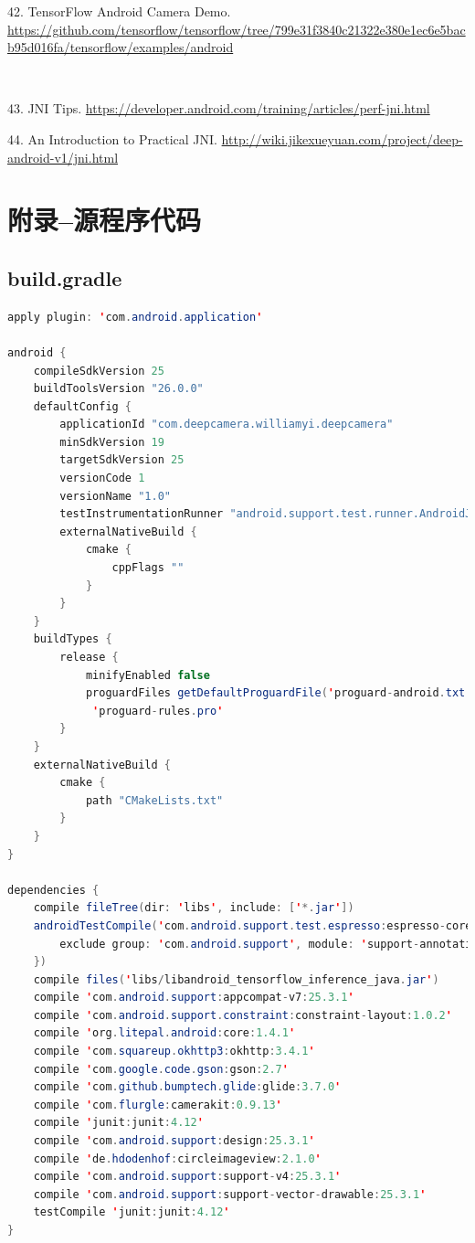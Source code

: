 \documentclass[UTF8, Microsoft YaHei]{book}
\begin{document}
    42. TensorFlow Android Camera Demo.  \url{https://github.com/tensorflow/tensorflow/tree/799e31f3840c21322e380e1ec6e5bacb95d016fa/tensorflow/examples/android}

    ~

    43. JNI Tips. \url{https://developer.android.com/training/articles/perf-jni.html}

    44. An Introduction to Practical JNI.  \url{http://wiki.jikexueyuan.com/project/deep-android-v1/jni.html}
    \chapter{附录--源程序代码}
    \section{build.gradle}
\begin{small}
\begin{lstlisting}[language=java]
apply plugin: 'com.android.application'

android {
    compileSdkVersion 25
    buildToolsVersion "26.0.0"
    defaultConfig {
        applicationId "com.deepcamera.williamyi.deepcamera"
        minSdkVersion 19
        targetSdkVersion 25
        versionCode 1
        versionName "1.0"
        testInstrumentationRunner "android.support.test.runner.AndroidJUnitRunner"
        externalNativeBuild {
            cmake {
                cppFlags ""
            }
        }
    }
    buildTypes {
        release {
            minifyEnabled false
            proguardFiles getDefaultProguardFile('proguard-android.txt'),
             'proguard-rules.pro'
        }
    }
    externalNativeBuild {
        cmake {
            path "CMakeLists.txt"
        }
    }
}

dependencies {
    compile fileTree(dir: 'libs', include: ['*.jar'])
    androidTestCompile('com.android.support.test.espresso:espresso-core:2.2.2', {
        exclude group: 'com.android.support', module: 'support-annotations'
    })
    compile files('libs/libandroid_tensorflow_inference_java.jar')
    compile 'com.android.support:appcompat-v7:25.3.1'
    compile 'com.android.support.constraint:constraint-layout:1.0.2'
    compile 'org.litepal.android:core:1.4.1'
    compile 'com.squareup.okhttp3:okhttp:3.4.1'
    compile 'com.google.code.gson:gson:2.7'
    compile 'com.github.bumptech.glide:glide:3.7.0'
    compile 'com.flurgle:camerakit:0.9.13'
    compile 'junit:junit:4.12'
    compile 'com.android.support:design:25.3.1'
    compile 'de.hdodenhof:circleimageview:2.1.0'
    compile 'com.android.support:support-v4:25.3.1'
    compile 'com.android.support:support-vector-drawable:25.3.1'
    testCompile 'junit:junit:4.12'
}
\end{lstlisting}
\end{small}
\end{document}
